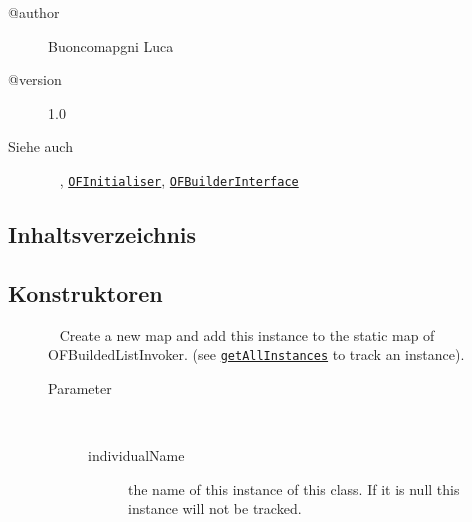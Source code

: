  \par 
\begin{description}
\item[@author] 
Buoncomapgni Luca
\item[@version] 
1.0
\item[Siehe auch] ~
\noprint, \texttt{\hyperlink{ontologyFramework.OFRunning.OFInitialising.OFInitialiser-class}{OFInitialiser}}, \texttt{\hyperlink{ontologyFramework.OFRunning.OFInitialising.OFBuilderInterface<T>-class}{OFBuilderInterface}}\end{description}
\subsection{Inhaltsverzeichnis}
\subsection{Konstruktoren}
\begin{description}
\item[{\label{ontologyFramework.OFRunning.OFInvokingManager.OFBuildedListInvoker(java.lang.String)}}]
~ Create a new map and add this instance to the static map of OFBuildedListInvoker. 
 (see \texttt{\hyperlink{ontologyFramework.OFRunning.OFInvokingManager.OFBuildedListInvoker.getAllInstances()}{getAllInstances}} to track an instance).
\begin{description}
\item[Parameter] ~
\begin{description}
\item[individualName]
the name of this instance of this class. If it is null
 this instance will not be tracked.
\end{description}
\end{description}
\end{description}
